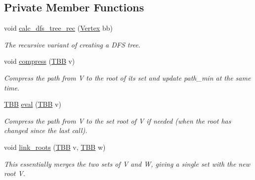 \subsection*{Private Member Functions}
\begin{DoxyCompactItemize}
\item 
void \hyperlink{classdom__info_a18d67c729387f2e0c4f352a4f754e9a7}{calc\+\_\+dfs\+\_\+tree\+\_\+rec} (\hyperlink{classdom__info_a5e4ca21e2c5281bdbb95d2c8d965c9be}{Vertex} bb)
\begin{DoxyCompactList}\small\item\em The recursive variant of creating a D\+FS tree. \end{DoxyCompactList}\item 
void \hyperlink{classdom__info_ab71b2fc1d5013a6deae14d348e4e74a6}{compress} (\hyperlink{Dominance_8hpp_ac35ffd4ddeccae8225d6ec6f55d65a97}{T\+BB} v)
\begin{DoxyCompactList}\small\item\em Compress the path from V to the root of its set and update path\+\_\+min at the same time. \end{DoxyCompactList}\item 
\hyperlink{Dominance_8hpp_ac35ffd4ddeccae8225d6ec6f55d65a97}{T\+BB} \hyperlink{classdom__info_ab777c47542a377b76521d81f4fe89b7f}{eval} (\hyperlink{Dominance_8hpp_ac35ffd4ddeccae8225d6ec6f55d65a97}{T\+BB} v)
\begin{DoxyCompactList}\small\item\em Compress the path from V to the set root of V if needed (when the root has changed since the last call). \end{DoxyCompactList}\item 
void \hyperlink{classdom__info_a6cd51fb7e9240c93d7f254b2a5e5b36a}{link\+\_\+roots} (\hyperlink{Dominance_8hpp_ac35ffd4ddeccae8225d6ec6f55d65a97}{T\+BB} v, \hyperlink{Dominance_8hpp_ac35ffd4ddeccae8225d6ec6f55d65a97}{T\+BB} w)
\begin{DoxyCompactList}\small\item\em This essentially merges the two sets of V and W, giving a single set with the new root V. \end{DoxyCompactList}\end{DoxyCompactItemize}
